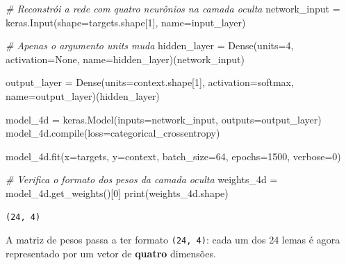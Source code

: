 \documentclass[
  brazilian,
]{article}
\newenvironment{Shaded}{}{}
\newcommand{\BuiltInTok}[1]{#1}
\newcommand{\CommentTok}[1]{\textcolor[rgb]{0.38,0.63,0.69}{\textit{#1}}}
\newcommand{\DecValTok}[1]{\textcolor[rgb]{0.25,0.63,0.44}{#1}}
\newcommand{\NormalTok}[1]{#1}
\newcommand{\OperatorTok}[1]{\textcolor[rgb]{0.40,0.40,0.40}{#1}}
\newcommand{\StringTok}[1]{\textcolor[rgb]{0.25,0.44,0.63}{#1}}
\newcommand{\VariableTok}[1]{\textcolor[rgb]{0.10,0.09,0.49}{#1}}
\begin{document}
\begin{Shaded}
\begin{Highlighting}[]
\CommentTok{\# Reconstrói a rede com quatro neurônios na camada oculta}
\NormalTok{network\_input }\OperatorTok{=}\NormalTok{ keras.Input(shape}\OperatorTok{=}\NormalTok{targets.shape[}\DecValTok{1}\NormalTok{], name}\OperatorTok{=}\StringTok{\textquotesingle{}input\_layer\textquotesingle{}}\NormalTok{)}

\CommentTok{\# Apenas o argumento \textquotesingle{}units\textquotesingle{} muda}
\NormalTok{hidden\_layer }\OperatorTok{=}\NormalTok{ Dense(units}\OperatorTok{=}\DecValTok{4}\NormalTok{, activation}\OperatorTok{=}\VariableTok{None}\NormalTok{, name}\OperatorTok{=}\StringTok{\textquotesingle{}hidden\_layer\textquotesingle{}}\NormalTok{)(network\_input)}

\NormalTok{output\_layer }\OperatorTok{=}\NormalTok{ Dense(units}\OperatorTok{=}\NormalTok{context.shape[}\DecValTok{1}\NormalTok{], activation}\OperatorTok{=}\StringTok{\textquotesingle{}softmax\textquotesingle{}}\NormalTok{,}
\NormalTok{                     name}\OperatorTok{=}\StringTok{\textquotesingle{}output\_layer\textquotesingle{}}\NormalTok{)(hidden\_layer)}

\NormalTok{model\_4d }\OperatorTok{=}\NormalTok{ keras.Model(inputs}\OperatorTok{=}\NormalTok{network\_input, outputs}\OperatorTok{=}\NormalTok{output\_layer)}
\NormalTok{model\_4d.}\BuiltInTok{compile}\NormalTok{(loss}\OperatorTok{=}\StringTok{\textquotesingle{}categorical\_crossentropy\textquotesingle{}}\NormalTok{)}

\NormalTok{model\_4d.fit(x}\OperatorTok{=}\NormalTok{targets, y}\OperatorTok{=}\NormalTok{context, batch\_size}\OperatorTok{=}\DecValTok{64}\NormalTok{, epochs}\OperatorTok{=}\DecValTok{1500}\NormalTok{, verbose}\OperatorTok{=}\DecValTok{0}\NormalTok{)}

\CommentTok{\# Verifica o formato dos pesos da camada oculta}
\NormalTok{weights\_4d }\OperatorTok{=}\NormalTok{ model\_4d.get\_weights()[}\DecValTok{0}\NormalTok{]}
\BuiltInTok{print}\NormalTok{(weights\_4d.shape)}
\end{Highlighting}
\end{Shaded}

\begin{verbatim}
(24, 4)
\end{verbatim}

A matriz de pesos passa a ter formato \texttt{(24,\ 4)}: cada um dos 24
lemas é agora representado por um vetor de \textbf{quatro} dimensões.
\end{document}
